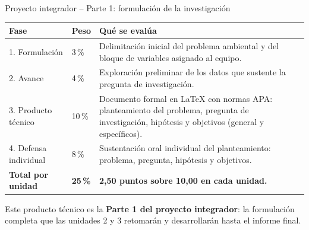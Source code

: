 \documentclass[aspectratio=169,11pt]{beamer}
\begin{document}
\begin{frame}{Proyecto integrador -- Parte 1: formulación de la investigación}
\footnotesize
\centering
\renewcommand{\arraystretch}{0.95}
\begin{tabularx}{\textwidth}{L{2.2cm}C{1.6cm}Y}
\toprule
\textbf{Fase} & \textbf{Peso} & \textbf{Qué se evalúa} \\
. Formulación & 3\,\% & Delimitación inicial del problema ambiental y del bloque de variables asignado al equipo. \\
2. Avance & 4\,\% & Exploración preliminar de los datos que sustente la pregunta de investigación. \\
3. Producto técnico & 10\,\% & Documento formal en \LaTeX{} con normas APA: planteamiento del problema, pregunta de investigación, hipótesis y objetivos (general y específicos). \\
4. Defensa individual & 8\,\% & Sustentación oral individual del planteamiento: problema, pregunta, hipótesis y objetivos. \\
\midrule
\textbf{Total por unidad} & \textbf{25\,\%} & \textbf{2,50 puntos sobre 10,00 en cada unidad.} \\
\bottomrule
\end{tabularx}
\vspace{0.02cm}
\begin{warnbox}[top=2pt,bottom=2pt]
\footnotesize Este producto técnico es la \textbf{Parte 1 del proyecto integrador}: la formulación completa que las unidades 2 y 3 retomarán y desarrollarán hasta el informe final.
\end{warnbox}
\end{frame}
\end{document}
